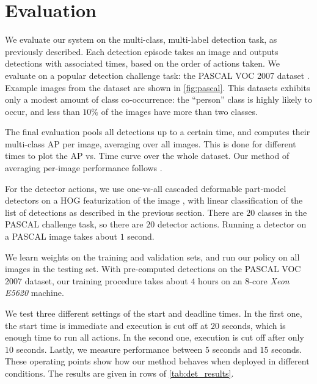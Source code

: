 \section{Evaluation}\label{sec:det_evaluation}



We evaluate our system on the multi-class, multi-label detection task, as previously described.
Each detection episode takes an image and outputs detections with associated times, based on the order of actions taken.
We evaluate on a popular detection challenge task: the PASCAL VOC 2007 dataset \parencite{pascal-voc-2010}.
Example images from the dataset are shown in \autoref{fig:pascal}.
This datasets exhibits only a modest amount of class co-occurrence: the ``person'' class is highly likely to occur, and less than $10\%$ of the images have more than two classes.

The final evaluation pools all detections up to a certain time, and computes their multi-class AP per image, averaging over all images.
This is done for different times to plot the AP vs. Time curve over the whole dataset.
Our method of averaging per-image performance follows \parencite{Desai2009}.

For the detector actions, we use one-vs-all cascaded deformable part-model detectors on a HOG featurization of the image \parencite{Felzenszwalb-CVPR-2010}, with linear classification of the list of detections as described in the previous section.
There are $20$ classes in the PASCAL challenge task, so there are $20$ detector actions.
Running a detector on a PASCAL image takes about $1$ second.

We learn weights on the training and validation sets, and run our policy on all images in the testing set.
With pre-computed detections on the PASCAL VOC 2007 dataset, our training procedure takes about $4$ hours on an $8$-core \emph{Xeon E5620} machine.

We test three different settings of the start and deadline times.
In the first one, the start time is immediate and execution is cut off at $20$ seconds, which is enough time to run all actions.
In the second one, execution is cut off after only $10$ seconds.
Lastly, we measure performance between $5$ seconds and $15$ seconds.
These operating points show how our method behaves when deployed in different conditions.
The results are given in rows of \autoref{tab:det_results}.

